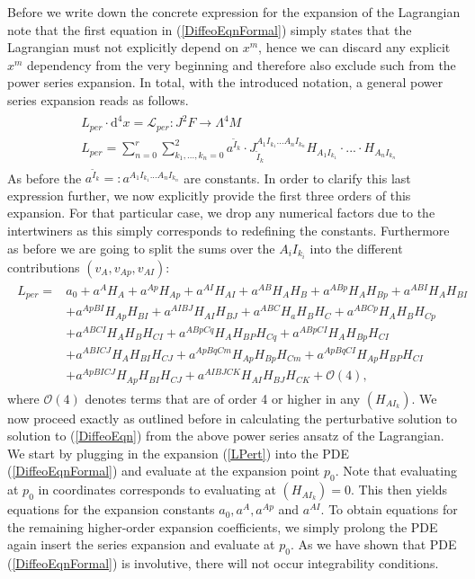 Before we write down the concrete expression for the expansion of the Lagrangian note that the first equation in (\ref{DiffeoEqnFormal}) simply states that the Lagrangian must not explicitly depend on $x^m$, hence we can discard any explicit $x^m$ dependency from the very beginning and therefore also exclude such from the power series expansion. In total, with the introduced notation, a general power series expansion reads as follows. 
\begin{align} \label{generalPowerSL}
    \begin{aligned}
    &L_{per} \cdot  \mathrm{d}^4x = \mathcal{L}_{per} : J^2F \longrightarrow \Lambda^4M \\
    &L_{per} = \sum_{n=0}^r \sum_{k_1,...,k_n = 0}^2 a^{\tilde{I}_k} \cdot J_{\tilde{I}_k}^{A_1I_{k_1}...A_nI_{k_n}} H_{A_1I_{k_1}} \cdot ... \cdot H_{A_nI_{k_n}}
    \end{aligned}
\end{align}
%
%
As before the $a^{\tilde{I}_k} =: a^{A_1I_{k_1}...A_nI_{k_n}}$ are constants. 
In order to clarify this last expression further, we now explicitly provide the first three orders of this expansion. For that particular case, we drop any numerical factors due to the intertwiners as this simply corresponds to redefining the constants. Furthermore as before we are going to split the sums over the ${A_iI_{k_i}}$ into the different contributions $(v_A,v_{Ap},v_{AI})$:
\begin{align}\label{LPert}
\begin{aligned}
    L_{per} = &a_0 + a^A H_A + a^{Ap} H_{Ap} + a^{AI}H_{AI} + a^{AB} H_{A}H_{B} + a^{ABp}H_A H_{Bp} + a^{ABI} H_{A} H_{BI}\\
    &+a^{ApBI}H_{Ap} H_{BI} + a^{AIBJ} H_{AI}H_{BJ} + a^{ABC} H_a H_B H_C 
    + a^{ABCp} H_A H_B H_{Cp} \\
    &+a^{ABCI} H_A H_B H_{CI} + a^{ABpCq} H_{A}H_{BP}H_{Cq} + a^{ABpCI} H_A H_{Bp} H_{CI}\\
    &+ a^{ABICJ} H_A H_{BI}H_{CJ} 
    + a^{ApBqCm} H_{Ap} H_{Bp} H_{Cm}+ a^{ApBq CI} H_{Ap} H_{BP} H_{CI}\\
    &+ a^{Ap BI CJ} H_{Ap} H_{BI} H_{CJ} + a^{AIBJCK} H_{AI} H_{BJ} H_{CK} + \mathcal{O}(4),
\end{aligned}
\end{align}
where $\mathcal{O}(4)$ denotes terms that are of order 4 or higher in any $(H_{AI_k})$. We now proceed exactly as outlined before in calculating the perturbative solution to solution to (\ref{DiffeoEqn}) from the above power series ansatz of the Lagrangian. We start by plugging in the expansion (\ref{LPert}) into the PDE (\ref{DiffeoEqnFormal}) and evaluate at the expansion point $p_0$. Note that evaluating at $p_0$ in coordinates corresponds to evaluating at $(H_{AI_k})=0$. This then yields equations for the expansion constants $a_0, a^A, a^{Ap}$ and $a^{AI}$. To obtain equations for the remaining higher-order expansion coefficients, we simply prolong the PDE again insert the series expansion and evaluate at $p_0$. As we have shown that PDE (\ref{DiffeoEqnFormal}) is involutive, there will not occur integrability conditions.

